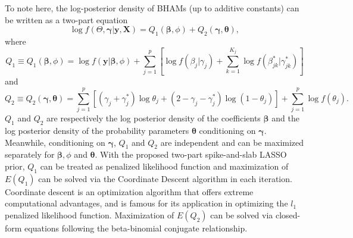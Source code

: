 \documentclass[AMA,STIX1COL,]{WileyNJD-v2}
\begin{document}
To note here, the log-posterior density of BHAMs (up to additive
constants) can be written as a two-part equation
\[ \log f(\Theta, \boldsymbol{\gamma}| \textbf{y}, \textbf{X}) = Q_1(\boldsymbol{\beta}, \phi) + Q_2 (\boldsymbol{\gamma},\boldsymbol{\theta}),\]
where
\[ Q_1\equiv Q_1(\boldsymbol{\beta}, \phi) = \log f(\textbf{y}|\boldsymbol{\beta}, \phi) + \sum\limits_{j=1}^p\left[\log f(\beta_j|\gamma_j)+\sum\limits_{k=1}^{K_j} \log f(\beta^{*}_{jk}|\gamma^{*}_{jk})\right]\]
and
\[Q_2 \equiv Q_2(\boldsymbol{\gamma},\boldsymbol{\theta}) = \sum\limits_{j=1}^{p} \left[ (\gamma_j+\gamma_{j}^{*})\log \theta_j + (2-\gamma_j-\gamma_{j}^{*}) \log (1-\theta_j)\right] +  \sum\limits_{j=1}^{p}\log f(\theta_j).\]
\(Q_1\) and \(Q_2\) are respectively the log posterior density of the
coefficients \(\boldsymbol{\beta}\) and the log posterior density of the
probability parameters \(\boldsymbol{\theta}\) conditioning on
\(\boldsymbol{\gamma}\). Meanwhile, conditioning on
\(\boldsymbol{\gamma}\), \(Q_1\) and \(Q_2\) are independent and can be
maximized separately for \(\boldsymbol{\beta}, \phi\) and
\(\boldsymbol{\theta}\). With the proposed two-part spike-and-slab LASSO
prior, \(Q_1\) can be treated as penalized likelihood function and
maximization of \(E(Q_1)\) can be solved via the Coordinate Descent
algorithm in each iteration. Coordinate descent is an optimization
algorithm that offers extreme computational advantages, and is famous
for its application in optimizing the \(l_1\) penalized likelihood
function. Maximization of \(E(Q_2)\) can be solved via closed-form
equations following the beta-binomial conjugate relationship.
\end{document}
